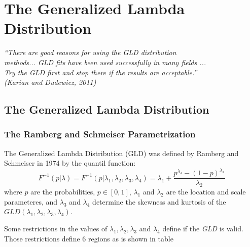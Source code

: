 \chapter[The Generalized Lambda Distribution]{The Generalized Lambda Distribution}\label{cap:gld}

\begin{flushright}
	\textit{``There are good reasons for using the GLD distribution \\
	methods... GLD fits have been used successfully in many fields ...\\
	Try the GLD first and stop there if the results are acceptable.''\\
	(Karian and Dudewicz, 2011)}
\end{flushright}

\section{The Generalized Lambda Distribution}

\subsection{The Ramberg and Schmeiser Parametrization}
The Generalized Lambda Distribution (GLD) was defined by Ramberg and Schmeiser in 1974 by the quantil function:
\begin{equation}
F^{-1}(p|\lambda)=F^{-1}(p|\lambda_{1}, \lambda_{2}, \lambda_{3}, \lambda_{4})=\lambda_{1}+\frac{p^{\lambda_{3}}-(1-p)^{\lambda_{4}}}{\lambda_{2}}
\end{equation}
where $p$ are the probabilities, $p\in[0,1]$, $\lambda_{1}$ and $\lambda_{2}$ are the location and scale parameteres, and $\lambda_{3}$ and $\lambda_{4}$ determine the skewness and kurtosis of the $GLD(\lambda_{1}, \lambda_{2}, \lambda_{3}, \lambda_{4})$.

Some restrictions in the values of $\lambda_{1}, \lambda_{2}, \lambda_{3}$ and  $\lambda_{4}$ define if the \textit{GLD} is valid. Those restrictions define 6 regions as is shown in table 

